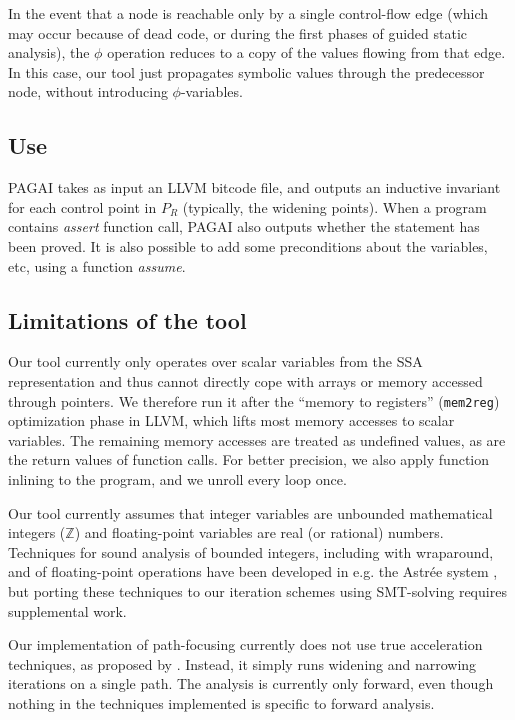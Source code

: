 \documentclass{entcs}
\newcommand{\ZZ}{\mathbb{Z}}
\begin{document}
In the event that a node is reachable only by a single control-flow edge (which may occur because of dead code, or during the first phases of guided static analysis), the $\phi$ operation reduces to a copy of the values flowing from that edge. In this case, our tool just propagates symbolic values through the predecessor node, without introducing $\phi$-variables.

\subsection{Use}

PAGAI takes as input an LLVM bitcode file, and outputs an inductive invariant
for each control point in $P_R$ (typically, the widening points).
When a program contains \emph{assert} function call, PAGAI also outputs whether
the statement has been proved.
It is also possible to add some preconditions about the variables, etc, using a
function \emph{assume}.
\subsection{Limitations of the tool}

Our tool currently only operates over scalar variables from the SSA representation and thus cannot directly cope with arrays or memory accessed through pointers. We therefore run it after the ``memory to registers'' (\texttt{mem2reg}) optimization phase in LLVM, which lifts most memory accesses to scalar variables.
The remaining memory accesses are treated as undefined values, as are the return
values of function calls. For better precision, we also apply function inlining
to the program, and we unroll every loop once.

Our tool currently assumes that integer variables are unbounded mathematical integers ($\ZZ$) and floating-point variables are real (or rational) numbers. Techniques for sound analysis of bounded integers, including with wraparound, and of floating-point operations have been developed in e.g. the Astr\'ee system \citep{ASTREE_ESOP05,ASTREE_PLDI03}, but porting these techniques to our iteration schemes using SMT-solving requires supplemental work.

Our implementation of path-focusing currently does not use true acceleration
techniques, as proposed by \citet{Monniaux_Gonnord_SAS11}. Instead, it simply runs widening and narrowing iterations on a single path.
The analysis is currently only forward, even though nothing in the techniques
implemented is specific to forward analysis.
\end{document}
